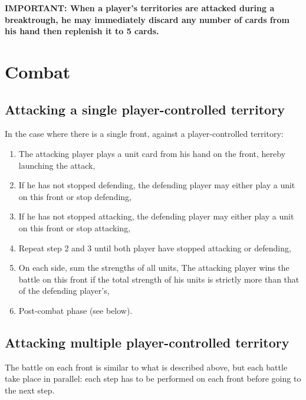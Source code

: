 \documentclass[a4paper]{article}
\begin{document}
    \hspace{-1.5em} \textbf{
    IMPORTANT: When a player's territories are attacked during a breaktrough, he may immediately
    discard any number of cards from his hand then replenish it to 5 cards.
    }


\section{Combat}

  \subsection{Attacking a single player-controlled territory}
  
    \hspace{-1.5em} In the case where there is a single front,
    against a player-controlled territory:
    \vspace{-1.3em}
    \begin{enumerate}
        \item The attacking player plays a unit card from his hand on the front,
        hereby launching the attack,
        \item If he has not stopped defending, the defending player may either play a unit on this front or stop defending,
        \item If he has not stopped attacking, the defending player may either play a unit on this front or stop attacking,
        \item Repeat step 2 and 3 until both player have stopped attacking or defending,
        \item On each side, sum the strengths of all units,
        The attacking player wins the battle on this front if the total strength of his units
        is strictly more than that of the defending player's,
        \item Post-combat phase (see below).
    \end{enumerate}
    

  \subsection{Attacking multiple player-controlled territory}
    
    The battle on each front is similar to what is described above,
    but each battle take place in parallel:
    each step has to be performed on each front before going to the next step.
    
\end{document}
